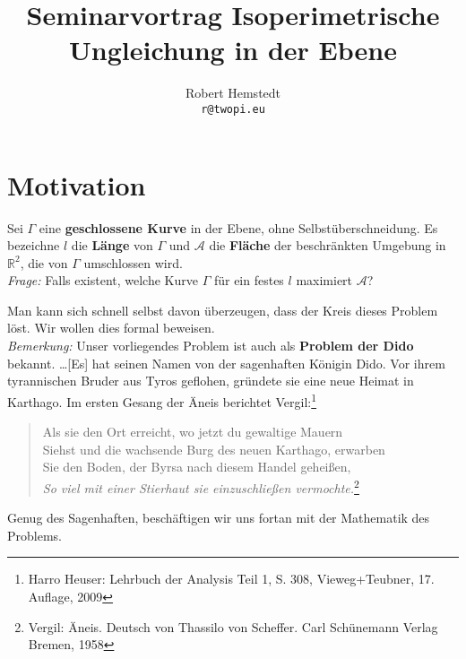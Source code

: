 \documentclass[12pt,a4paper]{article}
\author{Robert Hemstedt \\ \texttt{r@twopi.eu}}
\title{Seminarvortrag Isoperimetrische Ungleichung in der Ebene}
\theoremstyle{plain}
\newcommand{\R}{\mathbb{R}}
\numberwithin{equation}{section}
\begin{document}
\maketitle
\section{Motivation}
Sei $\Gamma$ eine \textbf{geschlossene Kurve} in der Ebene, ohne Selbstüberschneidung. Es bezeichne $l$ die \textbf{Länge} von $\Gamma$ und $\mathcal{A}$ die \textbf{Fläche} der beschränkten Umgebung in $\R^2$, die von $\Gamma$ umschlossen wird.\\
\textit{Frage:} Falls existent, welche Kurve $\Gamma$ für ein festes $l$ maximiert $\mathcal{A}$?

Man kann sich schnell selbst davon überzeugen, dass der Kreis dieses Problem löst.
Wir wollen dies formal beweisen.\\
\emph{Bemerkung:} Unser vorliegendes Problem ist auch als \textbf{Problem der Dido} bekannt. \glqq \ldots [Es] hat seinen Namen von der sagenhaften Königin Dido. Vor ihrem tyrannischen Bruder aus Tyros geflohen, gründete sie eine neue Heimat in Karthago. Im ersten Gesang der Äneis berichtet Vergil:\grqq\footnote{Harro Heuser: Lehrbuch der Analysis Teil 1, S. 308, Vieweg+Teubner, 17. Auflage, 2009}
\begin{quote}
\noindent Als sie den Ort erreicht, wo jetzt du gewaltige Mauern \\
Siehst und die wachsende Burg des neuen Karthago, erwarben \\
Sie den Boden, der Byrsa nach diesem Handel geheißen,\\
\emph{So viel mit einer Stierhaut sie einzuschließen vermochte.}\footnote{Vergil: Äneis. Deutsch von Thassilo von Scheffer. Carl Schünemann Verlag Bremen, 1958}
\end{quote}
Genug des Sagenhaften, beschäftigen wir uns fortan mit der Mathematik des Problems.
\end{document}
